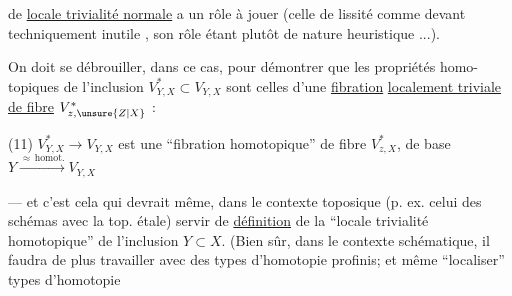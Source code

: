 de \uline{locale trivialité normale} a un rôle
à jouer (celle de lissité  comme
devant techniquement inutile , son rôle
étant plutôt de nature heuristique ...).

 On doit se débrouiller, dans ce cas,
pour démontrer que les propriétés homo-
topiques de l'inclusion $V^*_{Y,X}\subset V_{Y,X}$
sont celles d'une \uline{fibration}
\uline{localement triviale de fibre} $V^*_{z,\unsure{Z|X}}$ :

\noindent (11) $V^*_{Y,X}\longrightarrow V_{Y,X}$ est une ``fibration
homotopique'' de fibre $V^*_{z,X}$,
de base $Y\xrightarrow{\approx\,\mathrm{homot.}} V_{Y,X}$

--- et c'est cela qui devrait même,
dans le contexte toposique (p. ex. celui
des schémas avec la top. étale) servir
de \uline{définition} de la ``locale trivialité 
homotopique'' de l'inclusion $Y\subset X$.
(Bien sûr, dans le contexte schématique,
il faudra de plus travailler avec
des types d'homotopie profinis; et
même  ``localiser''  types d'homotopie
